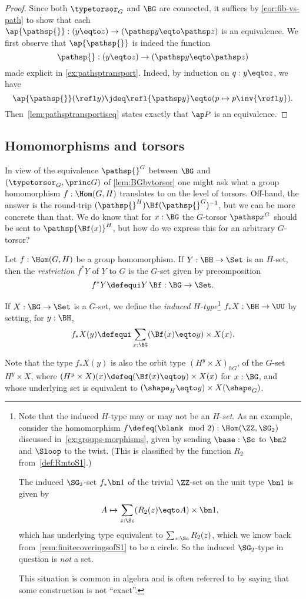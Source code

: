 \begin{proof}
  Since both $\typetorsor_G$ and $\BG$ are connected, it suffices by
  \cref{cor:fib-vs-path} to show that each
  $\ap {\pathsp{}}:(y\eqto z)\to(\pathsp y\eqto \pathsp z)$ is an
  equivalence. We first observe that $\ap {\pathsp{}}$ is indeed
  the function
  \[
    \pathsp{}:(y\eqto z)\to(\pathsp y\eqto\pathsp z)
  \]
  made explicit in \cref{ex:pathsptransport}. Indeed, by induction
  on $q:y\eqto z$, we have
  \[
    \ap {\pathsp{}}(\refl y) \jdeq \refl {\pathsp y} \eqto (p\mapsto p\inv{\refl y}).
  \]
  Then~\cref{lem:pathsptransportiseq} states exactly that $\ap P$ is
  an equivalence.
\end{proof}

\subsection{Homomorphisms and torsors}
\label{sec:homotor}
In view of the equivalence $\pathsp{}^G$ between $\BG$ and $(\typetorsor_G,\princ G)$ of \cref{lem:BGbytorsor} one might ask what a group homomorphism  $f:\Hom(G,H)$ translates to on the level of torsors.  Off-hand, the answer is the round-trip $(\pathsp{}^H)\Bf(\pathsp{}^G)^{-1}$, but we can be more concrete than that.
We do know that for $x:\BG$ the $G$-torsor $\pathsp x^G$ should be sent to
$\pathsp {\Bf(x)}^H$, but how do we express this for an arbitrary $G$-torsor?
\begin{definition}
  \label{def:restrictandinduce}
  Let $f:\Hom(G,H)$ be a group homomorphism.  If $Y:\BH\to\Set$ is an $H$-set,
  then the \emph{restriction}
  $f^*Y$ of $Y$ to $G$ is the $G$-set given by precomposition
  \[
    f^*Y\defequi Y\,\Bf:\BG\to\Set.
  \]

  If $X:\BG\to\Set$ is a $G$-set, we define
  the \emph{induced $H$-type}\footnote{%
    Note that the induced $H$-type may or may not be an $H$-\emph{set}.
    As an example, consider the homomorphism $f\defeq(\blank\mod 2) : \Hom(\ZZ,\SG_2)$
    discussed in~\cref{ex:groups-morphisms}, given by sending $\base:\Sc$
    to $\bn 2$ and $\Sloop$ to the twist. (This is classified by the function
    $R_2$ from~\cref{def:RmtoS1}.)

    The induced $\SG_2$-set $f_*\bn 1$ of the trivial
    $\ZZ$-set on the unit type $\bn 1$ is given by
    \[A\mapsto \sum_{z:\Sc}(R_2(z)\eqto A)\times \bn 1,\]
    which has underlying type equivalent to $\sum_{z:\Sc}R_2(z)$, which we know
    back from~\cref{rem:finitecoveringsofS1} to be a circle.
    So the induced $\SG_2$-type in question is \emph{not} a set.

    This situation is common in algebra and is often referred to by saying
    that some construction is not ``exact''.}
  $f_*X : \BH\to\UU$ by setting, for $y:\BH$,
  \[
    f_*X(y)\defequi\sum_{x:\BG}(\Bf(x) \eqto y)\times X(x).\qedhere
  \]
\end{definition}
Note that the type $f_*X(y)$ is also the orbit type $(H^y \times X)_{hG}$,
of the $G$-set $H^y\times X$,
where $(H^y\times X)(x) \defeq (\Bf(x) \eqto y)\times X(x)$ for $x:\BG$,
and whose underlying set is equivalent to $(\shape_H\eqto y)\times X(\shape_G)$.

